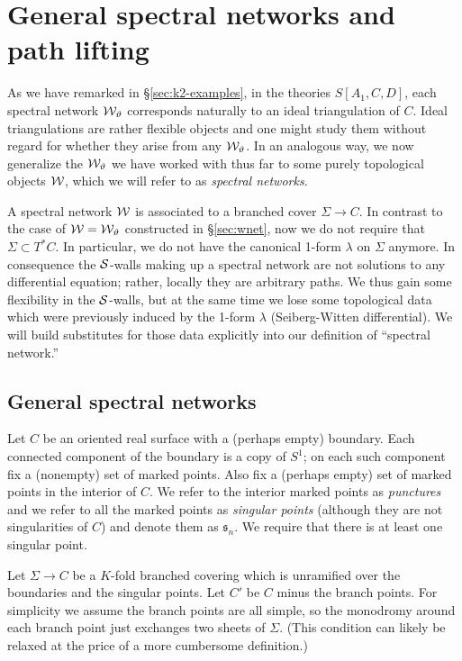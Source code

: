 \documentclass[11pt,a4paper]{article}
\def\wnet {{\cal W}}
\def\cS {{\cal S}}
\newcommand{\ti}[1]{\textit{#1}}
\def\wnet {{\cal W}}
\begin{document}
\section{General spectral networks and path lifting}\label{sec:spectral-networks}

As we have remarked in \S\ref{sec:k2-examples},
in the theories $S[A_1, C, D]$, each spectral network $\wnet_\vartheta$
corresponds naturally to an ideal triangulation of $C$.  Ideal triangulations are
rather flexible objects and one might study them without regard for whether they
arise from any $\wnet_\vartheta$.
In an analogous way, we now generalize the $\wnet_\vartheta$
we have worked with thus far to some purely topological objects $\wnet$,
which we will refer to as \ti{spectral networks.}

A spectral network $\wnet$ is associated to a branched cover
$\Sigma \to C$.  In contrast to the case of $\wnet = \wnet_\vartheta$ constructed in
\S\ref{sec:wnet}, now we do not require that $\Sigma \subset T^*C$.
In particular, we do not have the canonical 1-form $\lambda$ on $\Sigma$ anymore.
In consequence the $\cS$-walls making up a spectral network are not solutions
to any differential equation; rather, locally they are arbitrary paths.  We thus
gain some flexibility in the $\cS$-walls, but at the same time we lose some
topological data which were previously induced by the 1-form $\lambda$
(Seiberg-Witten differential).  We will build substitutes for those
data explicitly into our definition of ``spectral network.''


\subsection{General spectral networks}\label{subsec:GenSpecNet}

Let $C$ be an oriented real surface with a (perhaps empty) boundary.
Each connected component of the boundary is a copy of $S^1$;
on each such component fix a (nonempty) set of marked points.  Also fix a (perhaps empty) set of marked
points in the interior of $C$. We refer to the interior marked points as \emph{punctures} and
we refer to all the marked points as \ti{singular points} (although they are not singularities of $C$)
and denote them as $\mathfrak{s}_n$.  We require that there is at least one singular point.

Let $\Sigma \to C$ be a $K$-fold branched covering which is unramified
over the boundaries and the singular points.
Let $C'$ be $C$ minus the branch points.
For simplicity we assume the branch points are all simple,
so the monodromy around each branch point just exchanges
two sheets of $\Sigma$. (This condition can likely be relaxed at the price of a
more cumbersome definition.)
\end{document}
